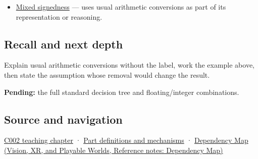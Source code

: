 \hypertarget{appendix-5e2d663adf7f-used-by}{}

\begin{itemize}
\tightlist
\item
  \hyperref[appendix-736a2345de4a]{Mixed signedness} --- uses usual arithmetic conversions as part of its representation or reasoning.
\end{itemize}

\subsection{Recall and next depth}\label{appendix-5e2d663adf7f-recall-and-next-depth}

\hypertarget{appendix-5e2d663adf7f-recall-and-next-depth}{}

Explain usual arithmetic conversions without the label, work the example above, then state the assumption whose removal would change the result.

\textbf{Pending:} the full standard decision tree and floating/integer combinations.

\subsection{Source and navigation}\label{appendix-5e2d663adf7f-source-and-navigation}

\hypertarget{appendix-5e2d663adf7f-source-and-navigation}{}

\hyperref[01-foundations-i-ch001-arithmetic-becomes-a-policy]{C002 teaching chapter} · \hyperref[appendix-fd090d982a15]{Part definitions and mechanisms} · \href{../07-Vision-XR-and-Playable-Worlds/main.pdf\#nameddest=appendix-4ad47bdd269a}{Dependency Map (Vision, XR, and Playable Worlds, Reference notes: Dependency Map)}
